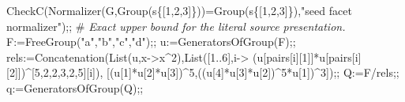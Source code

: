 \documentclass[
  10pt,
  letterpaper,
]{article}
\newenvironment{Shaded}{}{}
\newcommand{\BuiltInTok}[1]{\textcolor[rgb]{0.00,0.50,0.00}{#1}}
\newcommand{\CommentTok}[1]{\textcolor[rgb]{0.38,0.63,0.69}{\textit{#1}}}
\newcommand{\FloatTok}[1]{\textcolor[rgb]{0.25,0.63,0.44}{#1}}
\newcommand{\NormalTok}[1]{#1}
\newcommand{\OperatorTok}[1]{\textcolor[rgb]{0.40,0.40,0.40}{#1}}
\newcommand{\StringTok}[1]{\textcolor[rgb]{0.25,0.44,0.63}{#1}}
\newcommand{\VariableTok}[1]{\textcolor[rgb]{0.10,0.09,0.49}{#1}}
\begin{document}
\begin{Shaded}
\begin{Highlighting}[]
\VariableTok{CheckC}\NormalTok{(}\BuiltInTok{Normalizer}\NormalTok{(}\VariableTok{G}\OperatorTok{,}\BuiltInTok{Group}\NormalTok{(}\VariableTok{s}\NormalTok{\{[}\FloatTok{1}\OperatorTok{,}\FloatTok{2}\OperatorTok{,}\FloatTok{3}\NormalTok{]\}))}\OperatorTok{=}\BuiltInTok{Group}\NormalTok{(}\VariableTok{s}\NormalTok{\{[}\FloatTok{1}\OperatorTok{,}\FloatTok{2}\OperatorTok{,}\FloatTok{3}\NormalTok{]\})}\OperatorTok{,}\StringTok{"seed facet normalizer"}\NormalTok{)}\OperatorTok{;;}
\NormalTok{\#}\CommentTok{ Exact upper bound for the literal source presentation.}
\VariableTok{F}\OperatorTok{:=}\BuiltInTok{FreeGroup}\NormalTok{(}\StringTok{"a"}\OperatorTok{,}\StringTok{"b"}\OperatorTok{,}\StringTok{"c"}\OperatorTok{,}\StringTok{"d"}\NormalTok{)}\OperatorTok{;;} \VariableTok{u}\OperatorTok{:=}\BuiltInTok{GeneratorsOfGroup}\NormalTok{(}\VariableTok{F}\NormalTok{)}\OperatorTok{;;}
\VariableTok{rels}\OperatorTok{:=}\BuiltInTok{Concatenation}\NormalTok{(}\BuiltInTok{List}\NormalTok{(}\VariableTok{u}\OperatorTok{,}\VariableTok{x}\OperatorTok{{-}\textgreater{}}\VariableTok{x}\OperatorTok{\^{}}\FloatTok{2}\NormalTok{)}\OperatorTok{,}\BuiltInTok{List}\NormalTok{([}\FloatTok{1}\OperatorTok{..}\FloatTok{6}\NormalTok{]}\OperatorTok{,}\VariableTok{i}\OperatorTok{{-}\textgreater{}}
\NormalTok{ (}\VariableTok{u}\NormalTok{[}\VariableTok{pairs}\NormalTok{[}\VariableTok{i}\NormalTok{][}\FloatTok{1}\NormalTok{]]}\OperatorTok{*}\VariableTok{u}\NormalTok{[}\VariableTok{pairs}\NormalTok{[}\VariableTok{i}\NormalTok{][}\FloatTok{2}\NormalTok{]])}\OperatorTok{\^{}}\NormalTok{[}\FloatTok{5}\OperatorTok{,}\FloatTok{2}\OperatorTok{,}\FloatTok{2}\OperatorTok{,}\FloatTok{3}\OperatorTok{,}\FloatTok{2}\OperatorTok{,}\FloatTok{5}\NormalTok{][}\VariableTok{i}\NormalTok{])}\OperatorTok{,}
\NormalTok{ [(}\VariableTok{u}\NormalTok{[}\FloatTok{1}\NormalTok{]}\OperatorTok{*}\VariableTok{u}\NormalTok{[}\FloatTok{2}\NormalTok{]}\OperatorTok{*}\VariableTok{u}\NormalTok{[}\FloatTok{3}\NormalTok{])}\OperatorTok{\^{}}\FloatTok{5}\OperatorTok{,}\NormalTok{((}\VariableTok{u}\NormalTok{[}\FloatTok{4}\NormalTok{]}\OperatorTok{*}\VariableTok{u}\NormalTok{[}\FloatTok{3}\NormalTok{]}\OperatorTok{*}\VariableTok{u}\NormalTok{[}\FloatTok{2}\NormalTok{])}\OperatorTok{\^{}}\FloatTok{5}\OperatorTok{*}\VariableTok{u}\NormalTok{[}\FloatTok{1}\NormalTok{])}\OperatorTok{\^{}}\FloatTok{3}\NormalTok{])}\OperatorTok{;;}
\VariableTok{Q}\OperatorTok{:=}\VariableTok{F}\OperatorTok{/}\VariableTok{rels}\OperatorTok{;;} \VariableTok{q}\OperatorTok{:=}\BuiltInTok{GeneratorsOfGroup}\NormalTok{(}\VariableTok{Q}\NormalTok{)}\OperatorTok{;;}

\end{Highlighting}
\end{Shaded}
\end{document}
